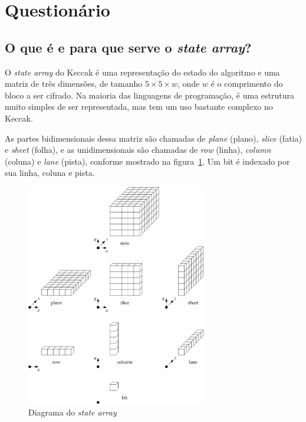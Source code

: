 \section{Questionário}

\let\oldsubsection\thesubsection%
\renewcommand{\thesubsection}{\thesection.\alph{subsection}}

\subsection{O que é e para que serve o \textit{state array}?}

O \textit{state array} do Keccak é uma representação do estado do algoritmo e
uma matriz de três dimensões, de tamanho $5 \times 5 \times w$, onde $w$ é o
comprimento do bloco a ser cifrado. Na maioria das linguagens de programação,
é uma estrutura muito simples de ser representada, mas tem um uso bastante
complexo no Keccak.

As partes bidimensionais dessa matriz são chamadas de \textit{plane} (plano),
\textit{slice} (fatia) e \textit{sheet} (folha), e as unidimensionais são
chamadas de \textit{row} (linha), \textit{column} (coluna) e \textit{lane}
(pista), conforme mostrado na figura~\ref{fig:statearray}. Um bit é indexado
por sua linha, coluna e pista.

\begin{figure}[ht]
    \centering
    \includegraphics[width=0.7\textwidth]{statearray.png}
    \caption{Diagrama do \textit{state array}}
    \label{fig:statearray}
\end{figure}

